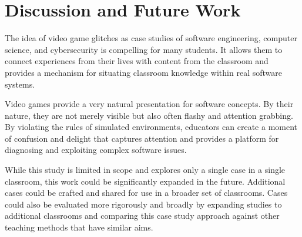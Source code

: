 \documentclass[letterpaper]{article}
\begin{document}
\section{Discussion and Future Work}

The idea of video game glitches as case studies of software engineering, computer science, and cybersecurity is compelling for many students. It allows them to connect experiences from their lives with content from the classroom and provides a mechanism for situating classroom knowledge within real software systems.

Video games provide a very natural presentation for software concepts. By their nature, they are not merely visible but also often flashy and attention grabbing. By violating the rules of simulated environments, educators can create a moment of confusion and delight that captures attention and provides a platform for diagnosing and exploiting complex software issues.

While this study is limited in scope and explores only a single case in a single classroom, this work could be significantly expanded in the future. Additional cases could be crafted and shared for use in a broader set of classrooms. Cases could also be evaluated more rigorously and broadly by expanding studies to additional classrooms and comparing this case study approach against other teaching methods that have similar aims.

%
%

\printbibliography
\end{document}

